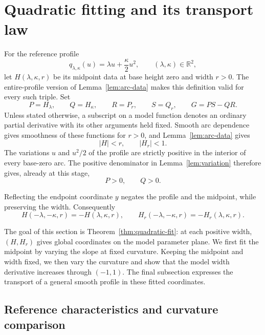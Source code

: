 \section{Quadratic fitting and its transport law}\label{sec:fitting}

For the reference profile
\[
 q_{\lambda,\kappa}(u)=\lambda u+\frac{\kappa}{2}u^2,
 \qquad (\lambda,\kappa)\in\mathbb R^2,
\]
let \(H(\lambda,\kappa,r)\) be its midpoint data at base height zero
and width \(r>0\).  The entire-profile version of Lemma~\ref{lem:arc-data}
makes this definition valid for every such triple.  Set
\begin{equation}\label{eq:fit-notation}
 P=H_\lambda,\qquad Q=H_\kappa,\qquad
 R=P_r,\qquad S=Q_r,\qquad G=PS-QR.
\end{equation}
Unless stated otherwise, a subscript on a model function denotes an
ordinary partial derivative with its other arguments held fixed.
Smooth arc dependence gives smoothness of these functions for \(r>0\),
and Lemma~\ref{lem:arc-data} gives
\begin{equation}\label{eq:fit-open-data}
 |H|<r,\qquad |H_r|<1.
\end{equation}
The variations \(u\) and \(u^2/2\) of the profile are strictly positive
in the interior of every base-zero arc.  The positive denominator in
Lemma~\ref{lem:variation} therefore gives, already at this stage,
\begin{equation}\label{eq:fit-PQ-positive}
 P>0,\qquad Q>0.
\end{equation}

Reflecting the endpoint coordinate \(y\) negates the profile and the
midpoint, while preserving the width.  Consequently
\begin{equation}\label{eq:fit-reflection}
 H(-\lambda,-\kappa,r)=-H(\lambda,\kappa,r),\qquad
 H_r(-\lambda,-\kappa,r)=-H_r(\lambda,\kappa,r).
\end{equation}

The goal of this section is Theorem~\ref{thm:quadratic-fit}: at each
positive width, \((H,H_r)\) gives global coordinates on the model
parameter plane. We first fit the midpoint by varying the slope at
fixed curvature. Keeping the midpoint and width fixed, we then vary
the curvature and show that the model width derivative increases
through \((-1,1)\). The final subsection expresses the transport
of a general smooth profile in these fitted coordinates.

\subsection{Reference characteristics and curvature comparison}

